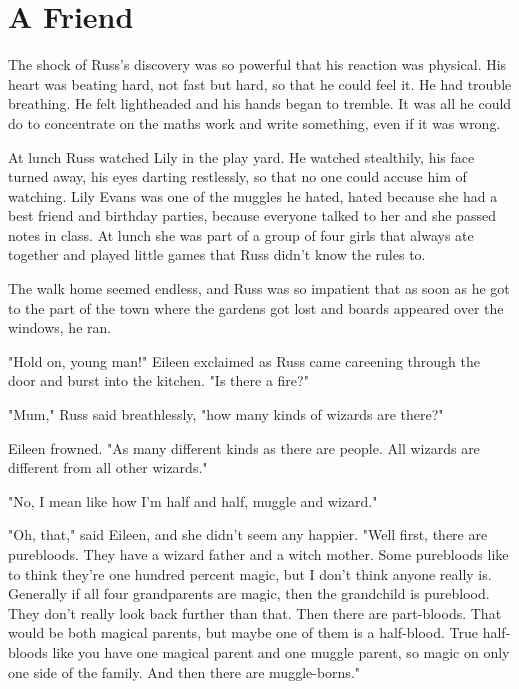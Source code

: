 
\chapter{A Friend}

The shock of Russ's discovery was so powerful that his reaction was physical. His heart was beating hard, not fast but hard, so that he could feel it. He had trouble breathing. He felt lightheaded and his hands began to tremble. It was all he could do to concentrate on the maths work and write something, even if it was wrong.

At lunch Russ watched Lily in the play yard. He watched stealthily, his face turned away, his eyes darting restlessly, so that no one could accuse him of watching. Lily Evans was one of the muggles he hated, hated because she had a best friend and birthday parties, because everyone talked to her and she passed notes in class. At lunch she was part of a group of four girls that always ate together and played little games that Russ didn't know the rules to.

The walk home seemed endless, and Russ was so impatient that as soon as he got to the part of the town where the gardens got lost and boards appeared over the windows, he ran.

"Hold on, young man!" Eileen exclaimed as Russ came careening through the door and burst into the kitchen. "Is there a fire?"

"Mum," Russ said breathlessly, "how many kinds of wizards are there?"

Eileen frowned. "As many different kinds as there are people. All wizards are different from all other wizards."

"No, I mean like how I'm half and half, muggle and wizard."

"Oh, that," said Eileen, and she didn't seem any happier. "Well first, there are purebloods. They have a wizard father and a witch mother. Some purebloods like to think they're one hundred percent magic, but I don't think anyone really is. Generally if all four grandparents are magic, then the grandchild is pureblood. They don't really look back further than that. Then there are part-bloods. That would be both magical parents, but maybe one of them is a half-blood. True half-bloods like you have one magical parent and one muggle parent, so magic on only one side of the family. And then there are muggle-borns."

